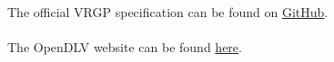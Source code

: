 The official VRGP specification can be found on \href{https://github.com/aboamare/vrgp-specifications/blob/master/Protocol\%20specification.md}{GitHub}.
\\\\
The OpenDLV website can be found \href{https://opendlv.org}{here}. 
